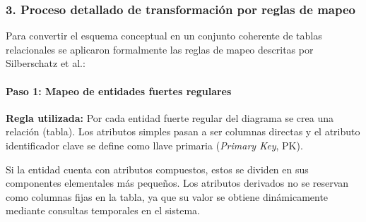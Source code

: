 \subsubsection{3. Proceso detallado de transformación por reglas de mapeo}
Para convertir el esquema conceptual en un conjunto coherente de tablas relacionales se aplicaron formalmente las reglas de mapeo descritas por Silberschatz et al.\cite{silberschatz2014}:

\paragraph{Paso 1: Mapeo de entidades fuertes regulares}
\textbf{Regla utilizada:} Por cada entidad fuerte regular del diagrama se crea una relación (tabla). Los atributos simples pasan a ser columnas directas y el atributo identificador clave se define como llave primaria (\textit{Primary Key}, PK). 

Si la entidad cuenta con atributos compuestos, estos se dividen en sus componentes elementales más pequeños. Los atributos derivados no se reservan como columnas fijas en la tabla, ya que su valor se obtiene dinámicamente mediante consultas temporales en el sistema.

